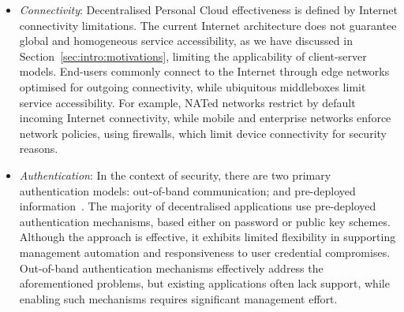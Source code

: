 \begin{itemize}
  \item {\it Connectivity}\/: Decentralised Personal Cloud effectiveness is
    defined by Internet connectivity limitations.  The current Internet
    architecture does not guarantee global and homogeneous service
    accessibility, as we have discussed in Section~\ref{sec:intro:motivations},
    limiting the applicability of client-server models.  End-users commonly
    connect to the Internet through edge networks optimised for outgoing
    connectivity, while ubiquitous middleboxes limit service accessibility. For
    example, NATed networks restrict by default incoming Internet connectivity,
    while mobile and enterprise networks enforce network policies, using
    firewalls, which limit device connectivity for security reasons.

  \item {\it Authentication}\/: In the context of security, there are two  
    primary authentication models: out-of-band communication;
    and pre-deployed information~. The majority of decentralised
    applications use pre-deployed authentication mechanisms, based either on
    password or public key schemes. Although the approach is effective, it
    exhibits limited flexibility in supporting management automation and
    responsiveness to user credential compromises. Out-of-band
    authentication mechanisms effectively address the aforementioned problems,
    but existing applications often lack support, while enabling such mechanisms
    requires significant management effort. 


\end{itemize}
